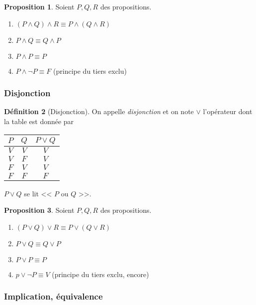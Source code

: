 \documentclass[11pt]{article}
\theoremstyle{definition}
\newtheorem{defn}{Définition}[section]
\newtheorem{prop}[defn]{Proposition}
\theoremstyle{remark}
\begin{document}
\begin{prop}
Soient $P,Q,R$ des propositions.
\begin{enumerate}
\item $(P\land Q)\land R \equiv P\land (Q\land R)$
\item $P\land Q \equiv Q\land P$
\item $P\land P\equiv P$
\item $P\land \neg P \equiv F$ (principe du tiers exclu)
\end{enumerate}

\end{prop}



\subsubsection{Disjonction}

\begin{defn}[Disjonction]
On appelle \textit{disjonction} et on note $\lor$ l'opérateur dont la table est donnée par
\begin{table}[ht]
\centering
\begin{tabular}{|c|c|c|}\hline
$P$ & $Q$ & $P\lor Q$ \\ \hline
$V$ & $V$ & $V$ \\\hline
$V$ & $F$ & $V$ \\\hline
$F$ & $V$ & $V$ \\\hline
$F$ & $F$ & $F$ \\\hline
\end{tabular}
\end{table}

$P\lor Q$ se lit << $P$ ou $Q$ >>.
\end{defn}

\begin{prop}
Soient $P,Q,R$ des propositions.
\begin{enumerate}
\item $(P\lor Q)\lor R \equiv P\lor (Q\lor R)$
\item $P\lor Q \equiv Q\lor P$
\item $P\lor P\equiv P$
\item $p\lor \neg P\equiv V$ (principe du tiers exclu, encore)
\end{enumerate}
\end{prop}



\subsubsection{Implication, équivalence}
\end{document}
